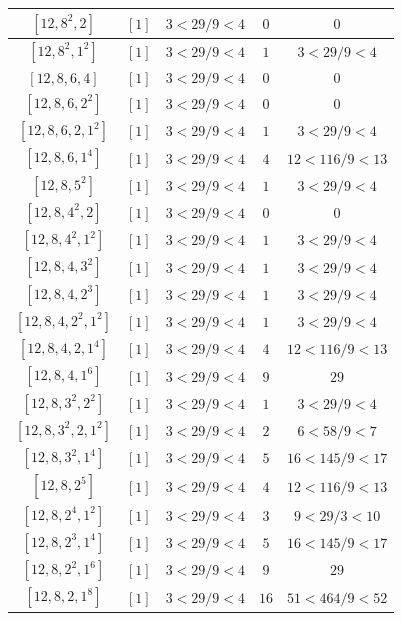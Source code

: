 \documentclass{article}%
\begin{document}
\begin{center}
\begin{longtable}{||c|c|c|c|c||}
$[12, 8^{2}, 2]$ & $[1]$ & $3 < 29/9 < 4$ & $0$ & $0$ \\ \hline 
$[12, 8^{2}, 1^{2}]$ & $[1]$ & $3 < 29/9 < 4$ & $1$ & $3 < 29/9 < 4$ \\ \hline 
$[12, 8, 6, 4]$ & $[1]$ & $3 < 29/9 < 4$ & $0$ & $0$ \\ \hline 
$[12, 8, 6, 2^{2}]$ & $[1]$ & $3 < 29/9 < 4$ & $0$ & $0$ \\ \hline 
$[12, 8, 6, 2, 1^{2}]$ & $[1]$ & $3 < 29/9 < 4$ & $1$ & $3 < 29/9 < 4$ \\ \hline 
$[12, 8, 6, 1^{4}]$ & $[1]$ & $3 < 29/9 < 4$ & $4$ & $12 < 116/9 < 13$ \\ \hline 
$[12, 8, 5^{2}]$ & $[1]$ & $3 < 29/9 < 4$ & $1$ & $3 < 29/9 < 4$ \\ \hline 
$[12, 8, 4^{2}, 2]$ & $[1]$ & $3 < 29/9 < 4$ & $0$ & $0$ \\ \hline 
$[12, 8, 4^{2}, 1^{2}]$ & $[1]$ & $3 < 29/9 < 4$ & $1$ & $3 < 29/9 < 4$ \\ \hline 
$[12, 8, 4, 3^{2}]$ & $[1]$ & $3 < 29/9 < 4$ & $1$ & $3 < 29/9 < 4$ \\ \hline 
$[12, 8, 4, 2^{3}]$ & $[1]$ & $3 < 29/9 < 4$ & $1$ & $3 < 29/9 < 4$ \\ \hline 
$[12, 8, 4, 2^{2}, 1^{2}]$ & $[1]$ & $3 < 29/9 < 4$ & $1$ & $3 < 29/9 < 4$ \\ \hline 
$[12, 8, 4, 2, 1^{4}]$ & $[1]$ & $3 < 29/9 < 4$ & $4$ & $12 < 116/9 < 13$ \\ \hline 
$[12, 8, 4, 1^{6}]$ & $[1]$ & $3 < 29/9 < 4$ & $9$ & $29$ \\ \hline 
$[12, 8, 3^{2}, 2^{2}]$ & $[1]$ & $3 < 29/9 < 4$ & $1$ & $3 < 29/9 < 4$ \\ \hline 
$[12, 8, 3^{2}, 2, 1^{2}]$ & $[1]$ & $3 < 29/9 < 4$ & $2$ & $6 < 58/9 < 7$ \\ \hline 
$[12, 8, 3^{2}, 1^{4}]$ & $[1]$ & $3 < 29/9 < 4$ & $5$ & $16 < 145/9 < 17$ \\ \hline 
$[12, 8, 2^{5}]$ & $[1]$ & $3 < 29/9 < 4$ & $4$ & $12 < 116/9 < 13$ \\ \hline 
$[12, 8, 2^{4}, 1^{2}]$ & $[1]$ & $3 < 29/9 < 4$ & $3$ & $9 < 29/3 < 10$ \\ \hline 
$[12, 8, 2^{3}, 1^{4}]$ & $[1]$ & $3 < 29/9 < 4$ & $5$ & $16 < 145/9 < 17$ \\ \hline 
$[12, 8, 2^{2}, 1^{6}]$ & $[1]$ & $3 < 29/9 < 4$ & $9$ & $29$ \\ \hline 
$[12, 8, 2, 1^{8}]$ & $[1]$ & $3 < 29/9 < 4$ & $16$ & $51 < 464/9 < 52$ \\ \hline 

\end{longtable}
\end{center}
\end{document}
